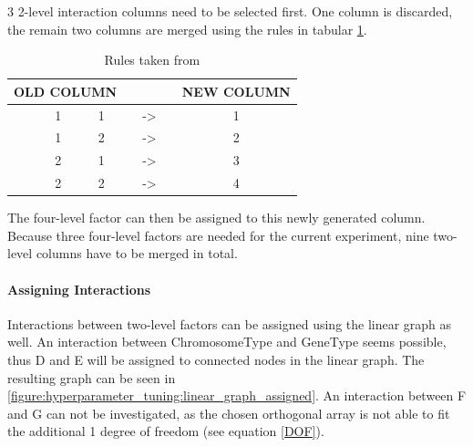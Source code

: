 3 2-level interaction columns need to be selected first. One column is discarded, the remain two columns are merged using the rules in tabular \ref{table:hyperparameter_tuning:merging_rules}.

\begin{table}[ht]
	\centering
	\begin{tabular}{ |ccccccc|  }
		\hline
		\multicolumn{3}{|c}{ OLD COLUMN } & & & & NEW COLUMN \\
		\hline
		& 1 & 1 & & -> & & 1\\
		& 1 & 2 & & -> & & 2\\
		& 2 & 1 & & -> & & 3\\
		& 2 & 2 & & -> & & 4\\
		\hline
	\end{tabular}
	\caption{Rules taken from \cite{roy_primer_1990}}
	\label{table:hyperparameter_tuning:merging_rules}
\end{table}

The four-level factor can then be assigned to this newly generated column. Because three four-level factors are needed for the current experiment, nine two-level columns have to be merged in total.

\paragraph{Assigning Interactions}
Interactions between two-level factors can be assigned using the linear graph as well. An interaction between ChromosomeType and GeneType seems possible, thus D and E will be assigned to connected nodes in the linear graph. The resulting graph can be seen in \ref{figure:hyperparameter_tuning:linear_graph_assigned}. An interaction between F and G can not be investigated, as the chosen orthogonal array is not able to fit the additional 1 degree of freedom (see equation \ref{DOF}).

